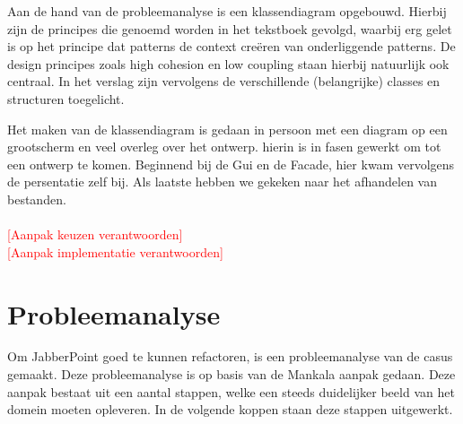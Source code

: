 \documentclass[a4paper]{article}
\newcommand{\todo}[1]{\textcolor{red}{[#1]}}
\newcommand{\1}[0]{\'{e}\'{e}n}
\begin{document}
Aan de hand van de probleemanalyse is een klassendiagram opgebouwd. Hierbij zijn
de principes die genoemd worden in het tekstboek gevolgd, waarbij erg gelet is
op het principe dat patterns de context creëren van onderliggende patterns. De
design principes zoals high cohesion en low coupling staan hierbij natuurlijk
ook centraal. In het verslag zijn vervolgens de verschillende (belangrijke)
classes en structuren toegelicht.

Het maken van de klassendiagram is gedaan in persoon met een diagram op een
grootscherm en veel overleg over het ontwerp. hierin is in fasen gewerkt om tot
een ontwerp te komen. Beginnend bij de Gui en de Facade, hier kwam vervolgens de
persentatie zelf bij. Als laatste hebben we gekeken naar het afhandelen van
bestanden.
\\\\
\todo{Aanpak keuzen verantwoorden}
\\
\todo{Aanpak implementatie verantwoorden}


\section{Probleemanalyse}
Om JabberPoint goed te kunnen refactoren, is een probleemanalyse van de casus gemaakt. Deze probleemanalyse is op basis van de Mankala aanpak gedaan. Deze aanpak bestaat uit een aantal stappen, welke een steeds duidelijker beeld van het domein moeten opleveren. In de volgende koppen staan deze stappen uitgewerkt.
\end{document}
